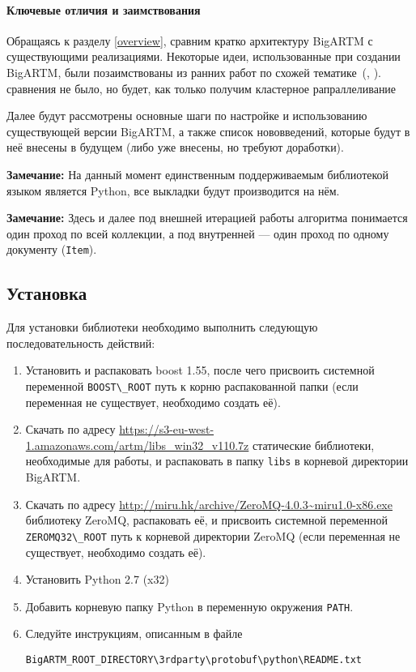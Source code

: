 \paragraph{Ключевые отличия и заимствования}
Обращаясь к разделу \ref{overview}, сравним кратко архитектуру BigARTM с существующими реализациями.
Некоторые идеи, использованные при создании BigARTM, были позаимствованы из ранних работ по схожей тематике~(\cite{smola}, \cite{ad_lda}).
сравнения не было, но будет, как только получим кластерное рапраллеливание

Далее будут рассмотрены основные шаги по настройке и использованию существующей версии BigARTM, а также список нововведений, которые будут в неё внесены в будущем (либо уже внесены, но требуют доработки).

{\bf Замечание:} На данный момент единственным поддерживаемым библиотекой языком является Python, все выкладки будут производится на нём.

{\bf Замечание:} Здесь и далее под внешней итерацией работы алгоритма понимается один проход по всей коллекции, а под внутренней --- один проход по одному документу (\verb|Item|). 

\subsection{Установка}

Для установки библиотеки необходимо выполнить следующую последовательность действий:

\begin{enumerate}
	\item Установить и распаковать boost 1.55, после чего присвоить системной переменной \verb|BOOST\_ROOT| путь к корню распакованной папки (если переменная не существует, необходимо создать её).
	\item Скачать по адресу \url{https://s3-eu-west-1.amazonaws.com/artm/libs_win32_v110.7z} 
	статические библиотеки, необходимые для работы, и распаковать в папку \verb|libs| в корневой директории BigARTM. 
	\item Скачать по адресу
	\url{http://miru.hk/archive/ZeroMQ-4.0.3~miru1.0-x86.exe}
	библиотеку ZeroMQ, распаковать её, и присвоить системной переменной \verb|ZEROMQ32\_ROOT| путь к корневой директории ZeroMQ (если переменная не существует, необходимо создать её).
	\item Установить Python 2.7 (x32)
	\item Добавить корневую папку Python в переменную окружения \verb|PATH|.
	\item Следуйте инструкциям, описанным в файле
	
	\vspace{5pt}
	\verb|BigARTM_ROOT_DIRECTORY\3rdparty\protobuf\python\README.txt| 
\end{enumerate}

